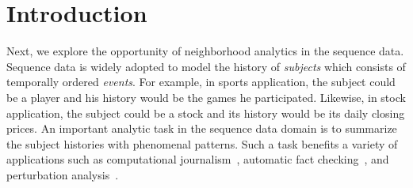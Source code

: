 \section{Introduction}
Next, we explore the opportunity of neighborhood analytics in the sequence data.
Sequence data is widely adopted to model the history
of \emph{subjects} which consists of temporally ordered \emph{events}.
For example, in sports application, the subject could be a player and his history would be the games he participated. Likewise, in stock application, the subject could be a stock and its history would be its daily closing prices.
%
An important analytic task in the sequence data domain
is to summarize the subject histories with phenomenal patterns.
Such a task benefits a variety
of applications such as computational journalism~\cite{cohen2011computational,zhang2014discovering}, automatic fact checking~\cite{hassan2014data,walenz2014finding}, and perturbation analysis~\cite{Walenz:2016:PAD:3007328.3007330}.


